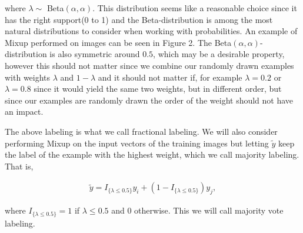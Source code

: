 \documentclass{article}
\begin{document}
where $\lambda \sim$ Beta$(\alpha, \alpha)$.
 This distribution seems like a 
reasonable choice since it has the right support(0 to 1) and the Beta-distribution is among the most natural distributions to
consider when working with probabilities. 
An example of Mixup performed on images can be seen in Figure 2.
The Beta$(\alpha, \alpha)$-distribution is also symmetric around $0.5$, which may be 
a desirable property, however this should not matter since we combine our randomly drawn examples with weights $\lambda$ and $1-\lambda$ and 
it should not matter if, for example $\lambda = 0.2$ or $\lambda = 0.8$ since it would yield the same two weights, but in different order, but 
since our examples are randomly drawn the order of the weight should not have an impact. 

% 

The above labeling is what we call fractional labeling.
We will also consider performing Mixup on the input vectors of the training images but letting $\tilde{y}$ keep the label of the example 
with the highest weight, which we call majority labeling. That is,

\begin{align*}
\tilde{y} = I_{\{ \lambda \leq 0.5 \}} y_i + (1-I_{\{ \lambda \leq 0.5 \}}) y_j, 
\end{align*}

where $I_{\{ \lambda \leq 0.5 \}} = 1$ if $\lambda \leq 0.5$ and $0$ otherwise. This we will call majority vote labeling.
\end{document}
